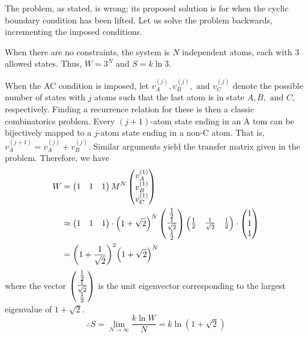 \item

The problem, as stated, is wrong; its proposed solution is for when
the cyclic boundary condition has been lifted.
Let us solve the problem backwards, incrementing the imposed conditions.

When there are no constraints, the system is $N$ independent atoms,
each with 3 allowed states.
Thus, $W = 3^N$ and $S = k \ln 3$.

When the AC condition is imposed, let $v_A^{(j)}, v_B^{(j)}, \text{ and } v_C^{(j)}$
denote the possible number of states with $j$ atoms such that the last atom is in state $A, B, \text{ and } C$, respectively.
Finding a recurrence relation for these is then a classic combinatorics problem.
Every $(j+1)$-atom state ending in an A tom can be bijectively mapped
to a $j$-atom state ending in a non-C atom.
That is, $v_A^{(j + 1)} = v_A^{(j)} + v_B^{(j)}$.
Similar arguments yield the transfer matrix given in the problem.
Therefore, we have
\begin{align*}
    W
    &= \begin{pmatrix}
        1 & 1 & 1
    \end{pmatrix} M^N \begin{pmatrix}
        v_A^{(1)} \\ v_B^{(1)} \\ v_C^{(1)}
    \end{pmatrix} \\
    &\approx \begin{pmatrix}
        1 & 1 & 1
    \end{pmatrix}
    \cdot {\left( 1 + \sqrt{2} \right)}^N \begin{pmatrix}
        \frac{1}{2} \\ \frac{1}{\sqrt{2}} \\ \frac{1}{2}
    \end{pmatrix} \begin{pmatrix}
        \frac{1}{2} & \frac{1}{\sqrt{2}} & \frac{1}{2}
    \end{pmatrix} \cdot \begin{pmatrix}
        1 \\ 1 \\ 1
    \end{pmatrix} \\
    &= {\left( 1 + \frac{1}{\sqrt{2}} \right)}^2 {\left( 1 + \sqrt{2} \right)}^N
\end{align*}
where the vector $\begin{pmatrix} \frac{1}{2} \\ \frac{1}{\sqrt{2}} \\ \frac{1}{2} \end{pmatrix}$ is the unit eigenvector
corresponding to the largest eigenvalue of $1 + \sqrt{2}$.
\[
    \therefore S
    = \lim_{N \rightarrow \infty} \frac{k \ln W}{N}
    = k \ln \left( 1 + \sqrt{2} \right)
\]

